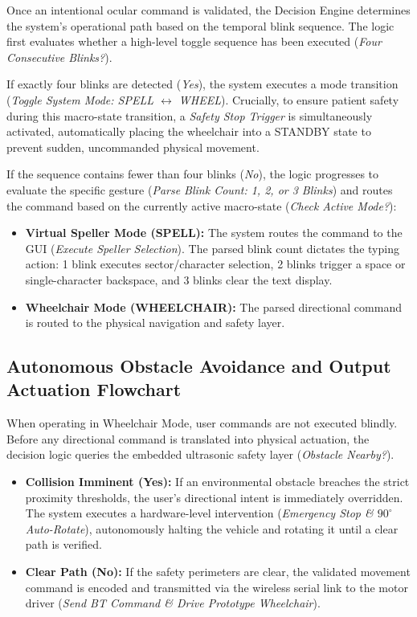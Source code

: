 Once an intentional ocular command is validated, the Decision Engine determines the system's operational path based on the temporal blink sequence. The logic first evaluates whether a high-level toggle sequence has been executed (\textit{Four Consecutive Blinks?}).

If exactly four blinks are detected (\textit{Yes}), the system executes a mode transition (\textit{Toggle System Mode: SPELL $\leftrightarrow$ WHEEL}). Crucially, to ensure patient safety during this macro-state transition, a \textit{Safety Stop Trigger} is simultaneously activated, automatically placing the wheelchair into a STANDBY state to prevent sudden, uncommanded physical movement.

If the sequence contains fewer than four blinks (\textit{No}), the logic progresses to evaluate the specific gesture (\textit{Parse Blink Count: 1, 2, or 3 Blinks}) and routes the command based on the currently active macro-state (\textit{Check Active Mode?}):

\begin{itemize}
    \item \textbf{Virtual Speller Mode (SPELL):} The system routes the command to the GUI (\textit{Execute Speller Selection}). The parsed blink count dictates the typing action: 1 blink executes sector/character selection, 2 blinks trigger a space or single-character backspace, and 3 blinks clear the text display.

    \item \textbf{Wheelchair Mode (WHEELCHAIR):} The parsed directional command is routed to the physical navigation and safety layer.
\end{itemize}

\FloatBarrier
\subsection{Autonomous Obstacle Avoidance and Output Actuation Flowchart}
\label{subsec:flowchart_arduino}

When operating in Wheelchair Mode, user commands are not executed blindly. Before any directional command is translated into physical actuation, the decision logic queries the embedded ultrasonic safety layer (\textit{Obstacle Nearby?}).

\begin{itemize}
    \item \textbf{Collision Imminent (Yes):} If an environmental obstacle breaches the strict proximity thresholds, the user's directional intent is immediately overridden. The system executes a hardware-level intervention (\textit{Emergency Stop \& $90^\circ$ Auto-Rotate}), autonomously halting the vehicle and rotating it until a clear path is verified.

    \item \textbf{Clear Path (No):} If the safety perimeters are clear, the validated movement command is encoded and transmitted via the wireless serial link to the motor driver (\textit{Send BT Command \& Drive Prototype Wheelchair}).
\end{itemize}

